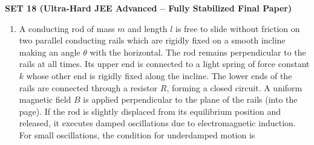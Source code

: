 \documentclass[12pt]{article}
\begin{document}
\begin{center}
{\Large \textbf{SET 18 (Ultra-Hard JEE Advanced – Fully Stabilized Final Paper)}}
\end{center}

\begin{enumerate}[leftmargin=*]

\item A conducting rod of mass $m$ and length $l$ is free to slide without friction on two parallel conducting rails which are rigidly fixed on a smooth incline making an angle $\theta$ with the horizontal. The rod remains perpendicular to the rails at all times. Its upper end is connected to a light spring of force constant $k$ whose other end is rigidly fixed along the incline. The lower ends of the rails are connected through a resistor $R$, forming a closed circuit. A uniform magnetic field $B$ is applied perpendicular to the plane of the rails (into the page). If the rod is slightly displaced from its equilibrium position and released, it executes damped oscillations due to electromagnetic induction. For small oscillations, the condition for underdamped motion is

\begin{center}
\end{center}


\end{enumerate}
\end{document}

